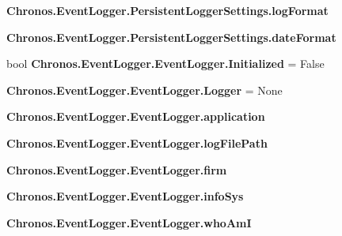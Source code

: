 \begin{DoxyCompactItemize}
\item 
{\bfseries Chronos.\+Event\+Logger.\+Persistent\+Logger\+Settings.\+log\+Format}\hypertarget{group__PyInfrastructure_ga8e3b5f5494b9452ee811dd5710d01465}{}\label{group__PyInfrastructure_ga8e3b5f5494b9452ee811dd5710d01465}

\item 
{\bfseries Chronos.\+Event\+Logger.\+Persistent\+Logger\+Settings.\+date\+Format}\hypertarget{group__PyInfrastructure_gaa37223293758e1a7b41d8efb8935eaca}{}\label{group__PyInfrastructure_gaa37223293758e1a7b41d8efb8935eaca}

\item 
bool {\bfseries Chronos.\+Event\+Logger.\+Event\+Logger.\+Initialized} = False\hypertarget{group__PyInfrastructure_ga799afad57238767f86b217fb7abc7c7c}{}\label{group__PyInfrastructure_ga799afad57238767f86b217fb7abc7c7c}

\item 
{\bfseries Chronos.\+Event\+Logger.\+Event\+Logger.\+Logger} = None\hypertarget{group__PyInfrastructure_ga35f2c5852654f9566d66b52903755be7}{}\label{group__PyInfrastructure_ga35f2c5852654f9566d66b52903755be7}

\item 
{\bfseries Chronos.\+Event\+Logger.\+Event\+Logger.\+application}\hypertarget{group__PyInfrastructure_ga511f2392fed7e662cff052dbd623ca49}{}\label{group__PyInfrastructure_ga511f2392fed7e662cff052dbd623ca49}

\item 
{\bfseries Chronos.\+Event\+Logger.\+Event\+Logger.\+log\+File\+Path}\hypertarget{group__PyInfrastructure_ga4def1c06d633cc7a5c5a562f62ddd0e1}{}\label{group__PyInfrastructure_ga4def1c06d633cc7a5c5a562f62ddd0e1}

\item 
{\bfseries Chronos.\+Event\+Logger.\+Event\+Logger.\+firm}\hypertarget{group__PyInfrastructure_ga42c5cbd5244408b243b9d7bc3344d2e0}{}\label{group__PyInfrastructure_ga42c5cbd5244408b243b9d7bc3344d2e0}

\item 
{\bfseries Chronos.\+Event\+Logger.\+Event\+Logger.\+info\+Sys}\hypertarget{group__PyInfrastructure_ga962e141215421253fd4a4d6064d197fa}{}\label{group__PyInfrastructure_ga962e141215421253fd4a4d6064d197fa}

\item 
{\bfseries Chronos.\+Event\+Logger.\+Event\+Logger.\+who\+AmI}\hypertarget{group__PyInfrastructure_ga8c7409f9ec7c92dec481861e887d3393}{}\label{group__PyInfrastructure_ga8c7409f9ec7c92dec481861e887d3393}


\end{DoxyCompactItemize}
